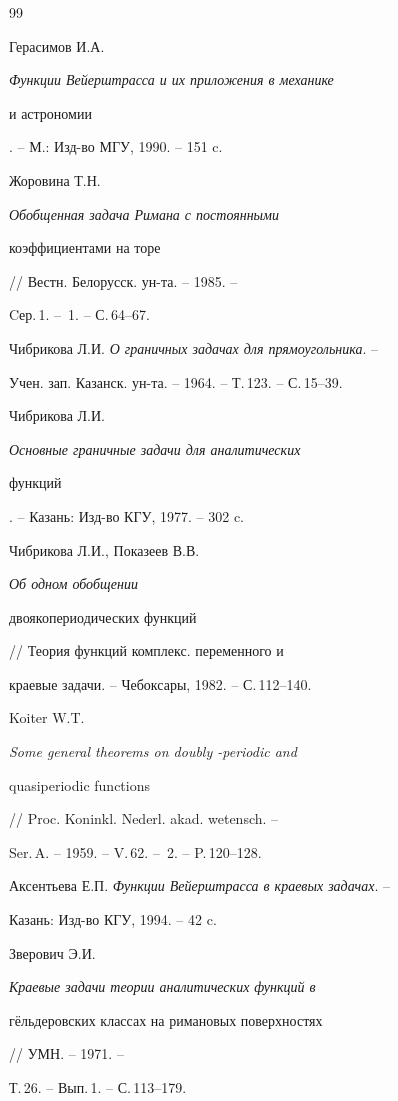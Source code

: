 \begin{thebibliography}{99} 


 




Герасимов И.А. {\em Функции Вейерштрасса и их приложения в механике 


и астрономии}. -- М.: Изд-во МГУ, 1990. -- 151 c. 




Жоровина Т.Н. {\em Обобщенная задача Римана с постоянными 


коэффициентами на торе} // Вестн. Белорусск. ун-та. -- 1985. -- 


Cер.\,1. -- \No\,1. -- С.\,64--67. 




Чибрикова Л.И. {\em О граничных задачах для прямоугольника}. -- 


Учен. зап. Казанск. ун-та. -- 1964. -- Т.\,123. -- С.\,15--39. 




Чибрикова Л.И. {\em Основные граничные задачи для аналитических 


функций}. -- Казань: Изд-во КГУ, 1977. -- 302 c. 




Чибрикова Л.И., Показеев В.В. {\em Об одном обобщении 


двоякопериодических функций} // Теория функций комплекс. переменного и 


краевые задачи. -- Чебоксары, 1982. -- С.\,112--140. 




Koiter W.T. {\em Some general theorems on doubly -periodic and 


quasiperiodic functions} // Proc. Koninkl. Nederl. akad. wetensch. -- 


Ser.\,A. -- 1959. -- V.\,62. -- \No\,2. -- P.\,120--128. 




Аксентьева Е.П. {\em Функции Вейерштрасса в краевых задачах}. -- 


Казань: Изд-во КГУ, 1994. -- 42 c. 




Зверович Э.И. {\em Краевые задачи теории аналитических функций в 


г\"ельдеровских классах на римановых поверхностях} // УМН. -- 1971. -- 


Т.\,26. -- Вып.\,1. -- С.\,113--179. 



\end{thebibliography}
